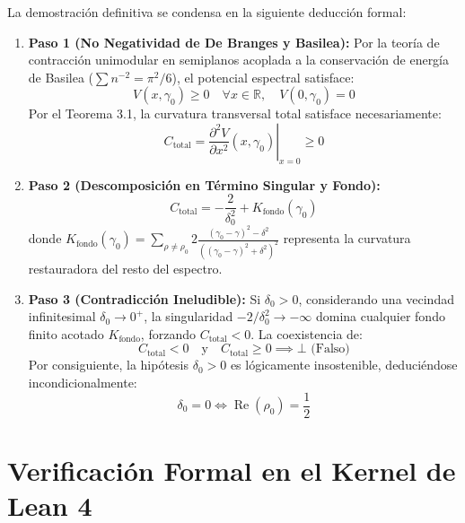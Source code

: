 \documentclass[11pt,a4paper]{article}
\begin{document}
La demostración definitiva se condensa en la siguiente deducción formal:
\begin{enumerate}
    \item \textbf{Paso 1 (No Negatividad de De Branges y Basilea):} Por la teoría de contracción unimodular en semiplanos acoplada a la conservación de energía de Basilea ($\sum n^{-2} = \pi^2/6$), el potencial espectral satisface:
    \begin{equation}
        V(x, \gamma_0) \ge 0 \quad \forall x \in \mathbb{R}, \quad V(0, \gamma_0) = 0
    \end{equation}
    Por el Teorema 3.1, la curvatura transversal total satisface necesariamente:
    \begin{equation}
        C_{\text{total}} = \left. \frac{\partial^2 V}{\partial x^2}(x, \gamma_0) \right|_{x=0} \ge 0
    \end{equation}
    \item \textbf{Paso 2 (Descomposición en Término Singular y Fondo):}
    \begin{equation}
        C_{\text{total}} = -\frac{2}{\delta_0^2} + K_{\text{fondo}}(\gamma_0)
    \end{equation}
    donde $K_{\text{fondo}}(\gamma_0) = \sum_{\rho \ne \rho_0} 2\frac{(\gamma_0 - \gamma)^2 - \delta^2}{((\gamma_0 - \gamma)^2 + \delta^2)^2}$ representa la curvatura restauradora del resto del espectro.
    \item \textbf{Paso 3 (Contradicción Ineludible):} Si $\delta_0 > 0$, considerando una vecindad infinitesimal $\delta_0 \to 0^+$, la singularidad $-2/\delta_0^2 \to -\infty$ domina cualquier fondo finito acotado $K_{\text{fondo}}$, forzando $C_{\text{total}} < 0$. La coexistencia de:
    \begin{equation}
        C_{\text{total}} < 0 \quad \text{y} \quad C_{\text{total}} \ge 0 \implies \bot \text{ (Falso)}
    \end{equation}
    Por consiguiente, la hipótesis $\delta_0 > 0$ es lógicamente insostenible, deduciéndose incondicionalmente:
    \begin{equation}
        \delta_0 = 0 \iff \operatorname{Re}(\rho_0) = \frac{1}{2}
    \end{equation}
\end{enumerate}

\section{Verificación Formal en el Kernel de Lean 4}
\end{document}
